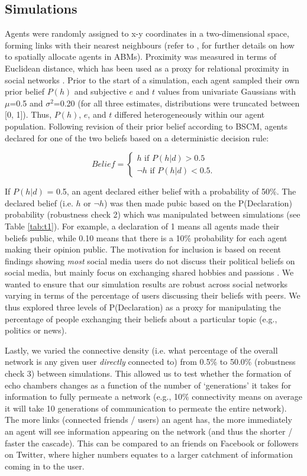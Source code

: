 \documentclass[fleqn,10pt]{wlscirep}
\begin{document}
\subsection*{Simulations}
Agents were randomly assigned to x-y coordinates in a two-dimensional space, forming links with their nearest neighbours (refer to \cite{wilensky2015introduction}, for further details on how to spatially allocate agents in ABMs). Proximity was measured in terms of Euclidean distance, which has been used as a proxy for relational proximity in social networks \cite{duggins2017}. Prior to the start of a simulation, each agent sampled their own prior belief \(P(h)\) and subjective \(e\) and \(t\) values from univariate Gaussians with \(\mu\)=0.5 and \(\sigma^2\)=0.20 (for all three estimates, distributions were truncated between [0, 1]). Thus, \(P(h)\), \(e\), and \(t\) differed heterogeneously within our agent population. Following revision of their prior belief according to BSCM, agents declared for one of the two beliefs based on a deterministic decision rule: 

\[
Belief = \begin{cases}
h \text{ if } P(h|d) > 0.5 \\
\neg h \text{ if } P(h|d) < 0.5. 
\end{cases}
\]

If \(P(h|d)\) = 0.5, an agent declared either belief with a probability of 50\%. The declared belief (i.e. \(h\) or \(\neg h\)) was then made pubic based on the P(Declaration) probability (robustness check 2) which was manipulated between simulations (see Table \ref{tab:t1}). For example, a declaration of 1 means all agents made their beliefs public, while 0.10 means that there is a 10\% probability for each agent making their opinion public. The motivation for inclusion is based on recent findings showing \emph{most} social media users do not discuss their political beliefs on social media, but mainly focus on exchanging shared hobbies and passions \cite{newman2019reuters}. We wanted to ensure that our simulation results are robust across social networks varying in terms of the percentage of users discussing their beliefs with peers. We thus explored three levels of P(Declaration) as a proxy for manipulating the percentage of people exchanging their beliefs about a particular topic (e.g., politics or news). 

Lastly, we varied the connective density (i.e. what percentage of the overall network is any given user \textit{directly} connected to) from 0.5\% to 50.0\% (robustness check 3) between simulations. This allowed us to test whether the formation of echo chambers changes as a function of the number of `generations' it takes for information to fully permeate a network (e.g., 10\% connectivity means on average it will take 10 generations of communication to permeate the entire network). The more links (connected friends / users) an agent has, the more immediately an agent will see information appearing on the network (and thus the shorter / faster the cascade). This can be compared to an friends on Facebook or followers on Twitter, where higher numbers equates to a larger catchment of information coming in to the user. 
\end{document}
